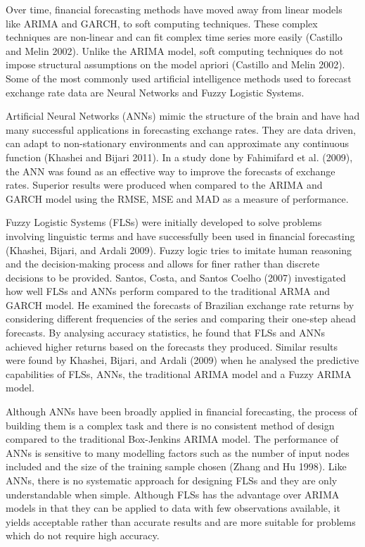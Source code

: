 \documentclass[12pt,a4paper]{article}
\numberwithin{equation}{section}
\numberwithin{figure}{section}
\numberwithin{table}{section}
\begin{document}
Over time, financial forecasting methods have moved away from linear
models like ARIMA and GARCH, to soft computing techniques. These complex
techniques are non-linear and can fit complex time series more easily
(Castillo and Melin 2002). Unlike the ARIMA model, soft computing
techniques do not impose structural assumptions on the model apriori
(Castillo and Melin 2002). Some of the most commonly used artificial
intelligence methods used to forecast exchange rate data are Neural
Networks and Fuzzy Logistic Systems.

Artificial Neural Networks (ANNs) mimic the structure of the brain and
have had many successful applications in forecasting exchange rates.
They are data driven, can adapt to non-stationary environments and can
approximate any continuous function (Khashei and Bijari 2011). In a
study done by Fahimifard et al. (2009), the ANN was found as an
effective way to improve the forecasts of exchange rates. Superior
results were produced when compared to the ARIMA and GARCH model using
the RMSE, MSE and MAD as a measure of performance.

Fuzzy Logistic Systems (FLSs) were initially developed to solve problems
involving linguistic terms and have successfully been used in financial
forecasting (Khashei, Bijari, and Ardali 2009). Fuzzy logic tries to
imitate human reasoning and the decision-making process and allows for
finer rather than discrete decisions to be provided. Santos, Costa, and
Santos Coelho (2007) investigated how well FLSs and ANNs perform
compared to the traditional ARMA and GARCH model. He examined the
forecasts of Brazilian exchange rate returns by considering different
frequencies of the series and comparing their one-step ahead forecasts.
By analysing accuracy statistics, he found that FLSs and ANNs achieved
higher returns based on the forecasts they produced. Similar results
were found by Khashei, Bijari, and Ardali (2009) when he analysed the
predictive capabilities of FLSs, ANNs, the traditional ARIMA model and a
Fuzzy ARIMA model.

Although ANNs have been broadly applied in financial forecasting, the
process of building them is a complex task and there is no consistent
method of design compared to the traditional Box-Jenkins ARIMA model.
The performance of ANNs is sensitive to many modelling factors such as
the number of input nodes included and the size of the training sample
chosen (Zhang and Hu 1998). Like ANNs, there is no systematic approach
for designing FLSs and they are only understandable when simple.
Although FLSs has the advantage over ARIMA models in that they can be
applied to data with few observations available, it yields acceptable
rather than accurate results and are more suitable for problems which do
not require high accuracy.
\end{document}
